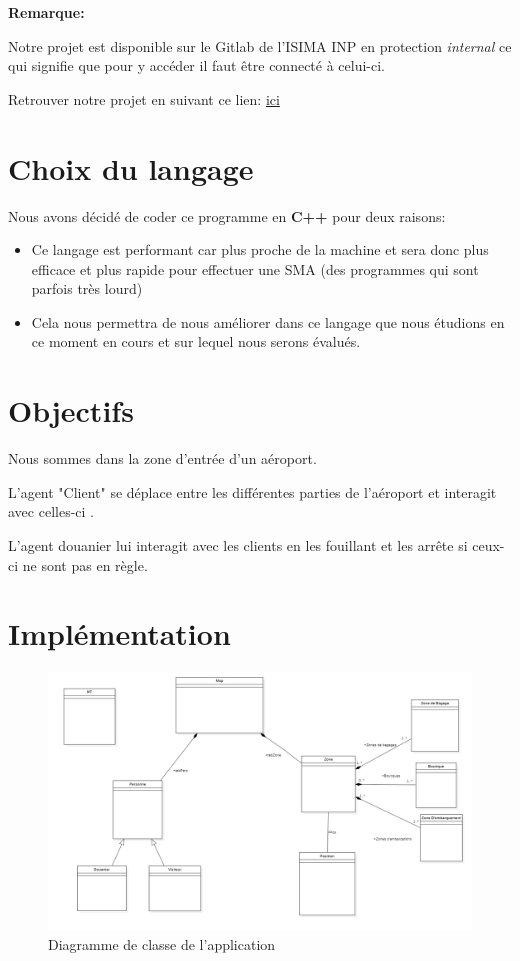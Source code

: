 \documentclass[12pt,french]{article} %
\begin{document}
 \bigskip
 
 \textbf{Remarque:}
 

Notre projet est disponible sur le Gitlab de l'ISIMA INP en protection \textit{internal} ce qui signifie que pour y accéder il faut être connecté à celui-ci.

Retrouver notre projet en suivant ce lien: \href{https://gitlab.isima.fr/liballejos/smairport}{ici}

\newpage

\section{Choix du langage}

Nous avons décidé de coder ce programme en \textbf{C++} pour deux raisons:

\medskip

\begin{itemize}
	\item Ce langage est performant car plus proche de la machine et sera donc plus efficace et plus rapide pour effectuer une SMA (des programmes qui sont parfois très lourd)
	
	\item Cela nous permettra de nous améliorer dans ce langage que nous étudions en ce moment en cours et sur lequel nous serons évalués.
\end{itemize}


\section{Objectifs}

Nous sommes dans la zone d'entrée d'un aéroport.

L'agent "Client" se déplace entre les différentes parties de l'aéroport et interagit avec celles-ci .

L'agent douanier lui interagit avec les clients en les fouillant et les arrête si ceux-ci ne sont pas en règle.


\section{Implémentation}


\begin{figure}[H]
	\centering
	\includegraphics[scale=0.4]{analyse.png}
	\caption{Diagramme de classe de l'application}    
\end{figure}
\end{document}
